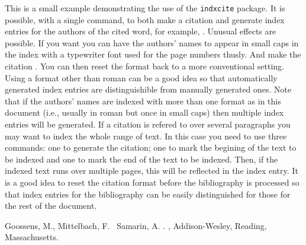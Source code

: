 \documentclass{article}
\begin{document}

This is a small example demonstrating the use of the \texttt{indxcite}
package.
It is possible, with a single command, to both make a citation and
generate index entries for the authors of the cited word,
for example, .
\pagebreak
Unusual effects are possible. If you want you can have the authors’ names to
appear in small caps in the index with a typewriter font used for the
page numbers thusly.
And make the citation .
You can then reset the format back to a more conventional setting.
Using a format other than roman can be a good idea so that automatically
generated index entries are distinguishible from manually generated
ones.
Note that if the authors’ names are indexed with more than one format
as in this document (i.e., usually in roman but once in small caps) then
multiple index entries will be generated.
\pagebreak
{}
If a citation is refered to over several paragraphs you may want to
index the whole range of text.
In this case you need to use three commands: one to generate the
citation\cite{latexcomp}; one to mark the begining of the text to
be indexed and one to mark the end of the text to be indexed.
\pagebreak
Then, if the indexed text runs over multiple pages, this will be
reflected in the index entry.
It is a good idea to reset the citation format before the bibliography
is processed so that index entries for the bibliography can be easily
distinguished for those for the rest of the document.
\begin{thebibliography}{xx}
Goossens, M., Mittelbach, F. \harvardand\ Samarin, A. \harvardyearleft
1993\harvardyearright .
, Addison-Wesley, Reading,
Massachusetts.\indexcite{latexcomp}
\end{thebibliography}
\printindex[aut]
\end{document}
